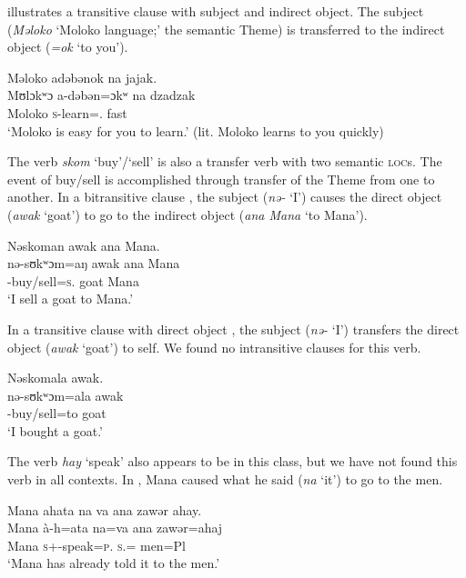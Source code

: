  illustrates a transitive clause with subject and indirect object.  The subject (\textit{Məloko} ‘Moloko language;’ the semantic Theme) is transferred to the indirect object (\textit{=ok}  ‘to you’).  

\ea \label{ex:9:39}
Məloko  adəbənok  na  jajak.\\
\gll  Mʊlɔkʷɔ  a-dəbən=ɔkʷ  na  dzadzak\\
      Moloko  \textsc{s}-learn={\twoS}.{\IO}  \textsc{{\PSP}}  fast\\
\glt  ‘Moloko is easy for you to learn.’ (lit. Moloko learns to you quickly)
\z

The verb \textit{skom} ‘buy’/‘sell’ is also a transfer verb with two semantic {\scshape loc}s. The event of buy/sell is accomplished through transfer of the Theme from one \LOC to another. In a bitransitive clause , the subject (\textit{nə-}  ‘I’) causes the direct object (\textit{awak} ‘goat’) to go to the indirect object (\textit{ana Mana} ‘to Mana’). 

\ea \label{ex:9:40}
Nəskoman  awak  ana  Mana.\\
\gll  nə-sʊkʷɔm=aŋ     awak   ana   Mana\\
      {\oneS}-buy/sell=\textsc{s}.{\IO}    goat  {\DAT} Mana\\
\glt   ‘I sell a goat to Mana.’ 
\z

In a transitive clause with direct object , the subject (\textit{nə-} ‘I’) transfers the direct object (\textit{awak} ‘goat’) to self. We found no intransitive clauses for this verb.

\ea \label{ex:9:41}
Nəskomala  awak.\\
\gll  nə-sʊkʷɔm=ala   awak\\
      {\oneS}-buy/sell=to  goat\\
\glt  ‘I bought a goat.’ 
\z

The verb \textit{hay} ‘speak’ also appears to be in this class, but we have not found this verb in all contexts. In , Mana caused what he said (\textit{na} ‘it’) to go to the men.  

\ea \label{ex:9:42}
Mana  ahata  na  va  ana  zawər  ahay.\\
\gll  Mana   à-h=ata   na=va   ana   zawər=ahaj\\
      Mana  \textsc{s}+{\PFV}-speak=\textsc{p}.{\IO}  \textsc{s}.{\DO}={\PRF}  {\DAT} men=Pl\\
\glt  ‘Mana has already told it to the men.’
\z

